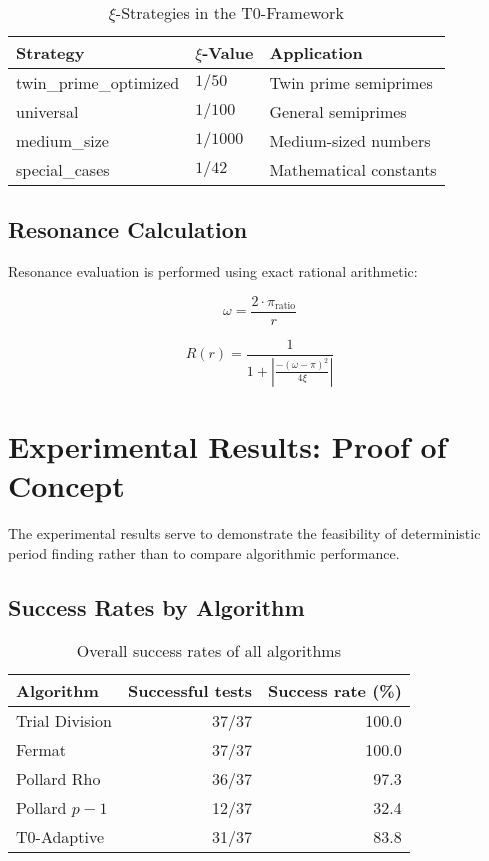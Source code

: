 \documentclass[12pt,a4paper]{article}
\begin{document}
	\begin{table}[H]
		\centering
		\caption{$\xi$-Strategies in the T0-Framework}
		\begin{tabular}{lll}
			\toprule
			\textbf{Strategy} & \textbf{$\xi$-Value} & \textbf{Application} \\
			\midrule
			twin\_prime\_optimized & $1/50$ & Twin prime semiprimes \\
			universal & $1/100$ & General semiprimes \\
			medium\_size & $1/1000$ & Medium-sized numbers \\
			special\_cases & $1/42$ & Mathematical constants \\
			\bottomrule
		\end{tabular}
		\label{tab:xi_strategies}
	\end{table}
	
	\subsection{Resonance Calculation}
	
	Resonance evaluation is performed using exact rational arithmetic:
	
	\begin{equation}
		\omega = \frac{2 \cdot \pi_{\text{ratio}}}{r}
	\end{equation}
	
	\begin{equation}
		R(r) = \frac{1}{1 + \left|\frac{-(\omega-\pi)^2}{4\xi}\right|}
	\end{equation}
	
	\section{Experimental Results: Proof of Concept}
	
	The experimental results serve to demonstrate the feasibility of deterministic period finding rather than to compare algorithmic performance.
	
	\subsection{Success Rates by Algorithm}
	
	\begin{table}[H]
		\centering
		\caption{Overall success rates of all algorithms}
		\begin{tabular}{lrr}
			\toprule
			\textbf{Algorithm} & \textbf{Successful tests} & \textbf{Success rate (\%)} \\
			\midrule
			Trial Division & 37/37 & 100.0 \\
			Fermat & 37/37 & 100.0 \\
			Pollard Rho & 36/37 & 97.3 \\
			Pollard $p-1$ & 12/37 & 32.4 \\
			T0-Adaptive & 31/37 & 83.8 \\
			\bottomrule
		\end{tabular}
		\label{tab:success_rates}
	\end{table}
	
\end{document}
